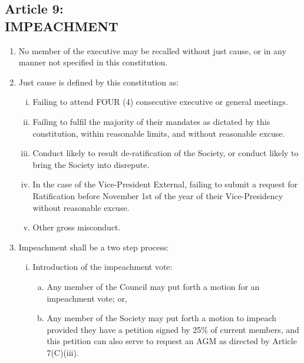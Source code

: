 \documentclass[]{report}
\begin{document}
\clearpage
\begin{center}
	\section*{Article 9:\\IMPEACHMENT}
	\vspace{12px}
\end{center}
\label{impeachment}
	\renewcommand{\theenumi}{\Alph{enumi}}
	\begin{enumerate}
	
		\item No member of the executive may be recalled without just cause, or in any manner not specified in this constitution.
		\item Just cause is defined by this constitution as:
			\begin{enumerate}[i.]
				\item Failing to attend FOUR (4) consecutive executive or general meetings.
				\item Failing to fulfil the majority of their mandates as dictated by this constitution, within reasonable limits, and without reasonable excuse.
				\item Conduct likely to result de-ratification of the Society, or conduct likely to bring the Society into disrepute.
				\item In the case of the Vice-President External, failing to submit a request for Ratification before November 1st of the year of their Vice-Presidency without reasonable excuse.
				\item Other gross misconduct.
			\end{enumerate}

		\item Impeachment shall be a two step process:
			\begin{enumerate}[i.]
				\item Introduction of the impeachment vote:
					\begin{enumerate}[(a)]
						\item Any member of the Council may put forth a motion for an impeachment vote; or,
						\item Any member of the Society may put forth a motion to impeach provided they have a petition signed by 25\% of current members, and this petition can also serve to request an AGM as directed by Article 7(C)(iii).
					\end{enumerate}
					

\end{enumerate}
\end{enumerate}
\end{document}
